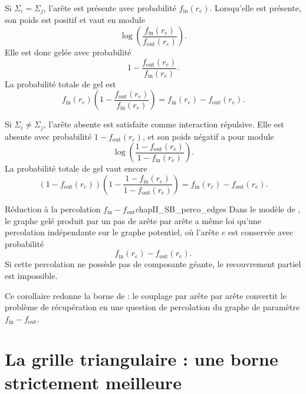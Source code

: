 Si $\Sigma_i=\Sigma_j$, l'arête est présente avec probabilité $f_{\mathrm{in}}(r_e)$. Lorsqu'elle est présente, son poids est positif et vaut en module
\[
    \log\left(\frac{f_{\mathrm{in}}(r_e)}{f_{\mathrm{out}}(r_e)}\right).
\]
Elle est donc gelée avec probabilité
\[
    1-\frac{f_{\mathrm{out}}(r_e)}{f_{\mathrm{in}}(r_e)}.
\]
La probabilité totale de gel est
\begin{equation}
    f_{\mathrm{in}}(r_e)
    \left(1-\frac{f_{\mathrm{out}}(r_e)}{f_{\mathrm{in}}(r_e)}\right)
    =
    f_{\mathrm{in}}(r_e)-f_{\mathrm{out}}(r_e).
    \label{eq:chapII_SB_edge_same}
\end{equation}

Si $\Sigma_i\neq\Sigma_j$, l'arête absente est satisfaite comme interaction répulsive. Elle est absente avec probabilité $1-f_{\mathrm{out}}(r_e)$, et son poids négatif a pour module
\[
    \log\left(\frac{1-f_{\mathrm{out}}(r_e)}{1-f_{\mathrm{in}}(r_e)}\right).
\]
La probabilité totale de gel vaut encore
\begin{equation}
    \left(1-f_{\mathrm{out}}(r_e)\right)
    \left(1-\frac{1-f_{\mathrm{in}}(r_e)}{1-f_{\mathrm{out}}(r_e)}\right)
    =
    f_{\mathrm{in}}(r_e)-f_{\mathrm{out}}(r_e).
    \label{eq:chapII_SB_edge_diff}
\end{equation}

\begin{Corollaire}{Réduction à la percolation $f_{\mathrm{in}}-f_{\mathrm{out}}$}{chapII_SB_perco_edges}
Dans le modèle de \SB{}, le graphe gelé produit par un pas de \SW{} arête par arête a même loi qu'une percolation indépendante sur le graphe potentiel, où l'arête $e$ est conservée avec probabilité
\begin{equation}
    f_{\mathrm{in}}(r_e)-f_{\mathrm{out}}(r_e).
    \label{eq:chapII_fin_fout}
\end{equation}
Si cette percolation ne possède pas de composante géante, le recouvrement partiel est impossible.
\end{Corollaire}

Ce corollaire redonne la borne de \SB{} : le couplage par \SW{} arête par arête convertit le problème de récupération en une question de percolation du graphe de paramètre $f_{\mathrm{in}}-f_{\mathrm{out}}$.

\section{La grille triangulaire : une borne strictement meilleure}
\label{sec:chapII_triangular_grid}

